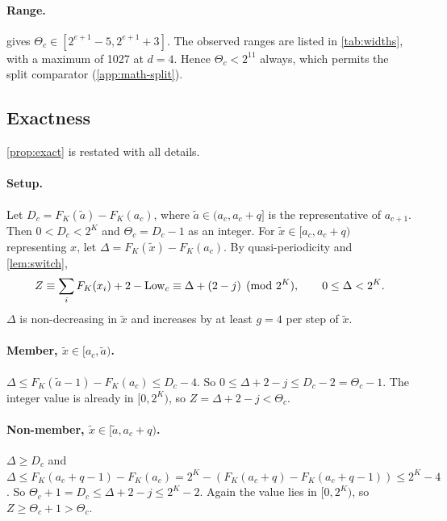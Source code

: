 \paragraph{Range.}  gives $\Theta_c \in [2^{e+1} - 5, 2^{e+1} + 3]$. The observed ranges are listed in \cref{tab:widths}, with a maximum of 1027 at $d = 4$. Hence $\Theta_c < 2^{11}$ always, which permits the split comparator (\cref{app:math-split}).

\subsection{Exactness}\label{app:math-exact}
\cref{prop:exact} is restated with all details.

\paragraph{Setup.} Let $D_c = F_K(\tilde a) - F_K(a_c)$, where $\tilde a \in (a_c, a_c + q]$ is the representative of $a_{c+1}$. Then $0 < D_c < 2^K$ and $\Theta_c = D_c - 1$ as an integer. For $\tilde x \in [a_c, a_c + q)$ representing $x$, let $\Delta = F_K(\tilde x) - F_K(a_c)$. By quasi-periodicity and \cref{lem:switch},
\begin{equation}
  Z \equiv \sum_i F_K(x_i) + 2 - \mathrm{Low}_c \equiv \Delta + (2 - j) \pmod{2^K}, \qquad 0 \le \Delta < 2^K .
\end{equation}
$\Delta$ is non-decreasing in $\tilde x$ and increases by at least $g = 4$ per step of $\tilde x$.

\paragraph{Member, $\tilde x \in [a_c, \tilde a)$.} $\Delta \le F_K(\tilde a - 1) - F_K(a_c) \le D_c - 4$. So $0 \le \Delta + 2 - j \le D_c - 2 = \Theta_c - 1$. The integer value is already in $[0, 2^K)$, so $Z = \Delta + 2 - j < \Theta_c$.

\paragraph{Non-member, $\tilde x \in [\tilde a, a_c + q)$.} $\Delta \ge D_c$ and $\Delta \le F_K(a_c + q - 1) - F_K(a_c) = 2^K - (F_K(a_c + q) - F_K(a_c + q - 1)) \le 2^K - 4$. So $\Theta_c + 1 = D_c \le \Delta + 2 - j \le 2^K - 2$. Again the value lies in $[0, 2^K)$, so $Z \ge \Theta_c + 1 > \Theta_c$.

